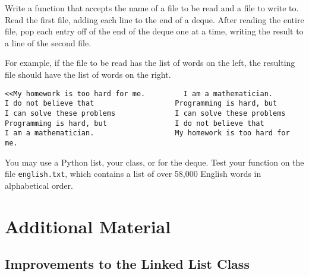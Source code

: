 \begin{problem} %
Write a function that accepts the name of a file to be read and a file to write to.
Read the first file, adding each line to the end of a deque.
After reading the entire file, pop each entry off of the end of the deque one at a time, writing the result to a line of the second file.

For example, if the file to be read has the list of words on the left, the resulting file should have the list of words on the right.

\begin{lstlisting}
<<My homework is too hard for me.         I am a mathematician.
I do not believe that                   Programming is hard, but
I can solve these problems              I can solve these problems
Programming is hard, but                I do not believe that
I am a mathematician.                   My homework is too hard for me.
\end{lstlisting}

You may use a Python list, your  class, or  for the deque.
Test your function on the file \texttt{english.txt}, which contains a list of over 58,000 English words in alphabetical order.
\end{problem}

\newpage

\section*{Additional Material} %

\subsection*{Improvements to the Linked List Class} %

